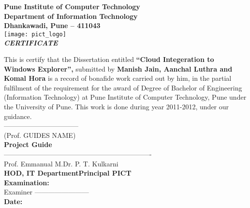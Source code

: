 \begin{center}
\thispagestyle{empty}

\LARGE{\textbf{Pune Institute of Computer Technology}} \\ 
\large{\textbf{Department of Information Technology}}\\
\large{\textbf{Dhankawadi, Pune – 411043}}\\[0.5cm]

\texttt{[image: pict\_logo]}\\[0.5cm]

{\Huge \textbf{\emph{CERTIFICATE}}}\\[0.5cm]
\end{center}
\linespread{1.13}
\large{This is certify that the Dissertation entitled 
\textbf{``Cloud Integeration to Windows Explorer'',} 
submitted by 
\textbf{Manish Jain, Aanchal Luthra and Komal Hora}
 is a record of bonafide work carried out by him, in the partial
 fulfilment of the requirement for the award of Degree of Bachelor of
 Engineering (Information Technology) at Pune Institute of Computer
 Technology, Pune under the University of Pune. This work is done
 during year 2011-2012, under our guidance.}\\[1.0cm]
\large{---------------------------------}\\
\large{(Prof. GUIDES NAME)}\\[0.3cm]
\textbf{Project Guide}\\[1.0cm]
\large{--------------------------------}\hspace*{1.5in}\large{----------------------------------}\\
\large{Prof. Emmanual M.}\hspace*{2.0in}\large{Dr. P. T. Kulkarni}\\[0.3cm]
\textbf{HOD, IT Department}\hspace*{1.73in}\textbf{Principal PICT}\\[0.5cm]
\Large{\textbf{Examination:}}\\[0.8cm]
\large{Examiner ------------------------}\\[0.8cm]
\Large{\textbf{Date:}}
\newpage
